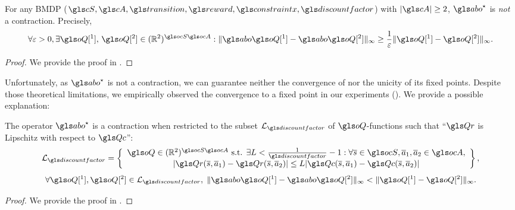\begin{theorem}
	\begin{leftbar}[theorembar]
	\label{thm:contraction}
	For any \gls{BMDP} ($\cS,\cA,\Ps,\R,\constraint,\discountfactor$) with $|\cA| \geq 2$, $\abo^{\star}$ is \emph{not} a contraction. Precisely, $$\forall\epsilon>0, \exists \oQ[^1],\,\oQ[^2]\in(\Real^2)^{\ocS\ocA}:\|\abo \oQ[^1]-\abo \oQ[^2]\|_\infty \geq \frac{1}{\epsilon}\|\oQ[^1] - \oQ[^2]\|_\infty.$$
	\end{leftbar}
\end{theorem}
\begin{proof}
	We provide the proof in .
\end{proof}

Unfortunately, as $\abo^{\star}$ is not a contraction, we can guarantee neither the convergence of  nor the unicity of its fixed points. Despite those theoretical limitations, we empirically observed the convergence to a fixed point in our experiments (). We provide a possible explanation:

\begin{theorem}
	\begin{leftbar}[theorembar]
	\label{thm:contractivity-smooth}
	The operator $\abo^{\star}$ is a contraction when restricted to the subset $\cL_{\discountfactor}$ of $\oQ$-functions such that \enquote{$\Qr$ is Lipschitz with respect to $\Qc$}:
	\begin{equation}
	\cL_\discount = \left\{\begin{array}{cc}
	\oQ\in(\Real^2)^{\ocS\ocA}\text{ s.t. }\exists L<\frac{1}{\discount}-1: \forall \os\in\ocS,\oa_1,\oa_2\in\ocA,   \\
	|\Qr(\os,\oa_1) - \Qr(\os,\oa_2)| \leq L|\Qc(\os,\oa_1) - \Qc(\os,\oa_2)|
	\end{array}\right\},
	\end{equation}
	\begin{equation*}
	\forall \oQ[^1],\oQ[^2]\in \cL_\discount,\; \|\abo \oQ[^1]- \abo \oQ[^2]\|_\infty  < \|\oQ[^1]-\oQ[^2]\|_\infty.
	\end{equation*}
	\end{leftbar}
\end{theorem}
\begin{proof}
	We provide the proof in .
\end{proof}

